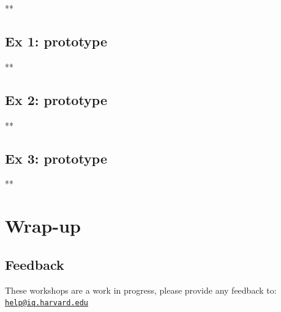 \documentclass[
]{book}
\newenvironment{Shaded}{\begin{snugshade}}{\end{snugshade}}
\newcommand{\NormalTok}[1]{#1}
\begin{document}
\begin{Shaded}
\begin{Highlighting}[]
\NormalTok{**}
\end{Highlighting}
\end{Shaded}

\hypertarget{ex-1-prototype-8}{%
\subsection{Ex 1: prototype}\label{ex-1-prototype-8}}

\begin{Shaded}
\begin{Highlighting}[]
\NormalTok{**}
\end{Highlighting}
\end{Shaded}

\hypertarget{ex-2-prototype-6}{%
\subsection{Ex 2: prototype}\label{ex-2-prototype-6}}

\begin{Shaded}
\begin{Highlighting}[]
\NormalTok{**}
\end{Highlighting}
\end{Shaded}

\hypertarget{ex-3-prototype-5}{%
\subsection{Ex 3: prototype}\label{ex-3-prototype-5}}

\begin{Shaded}
\begin{Highlighting}[]
\NormalTok{**}
\end{Highlighting}
\end{Shaded}

\hypertarget{wrap-up-9}{%
\section{Wrap-up}\label{wrap-up-9}}

\hypertarget{feedback-9}{%
\subsection{Feedback}\label{feedback-9}}

These workshops are a work in progress, please provide any feedback to: \href{mailto:help@iq.harvard.edu}{\nolinkurl{help@iq.harvard.edu}}
\end{document}
